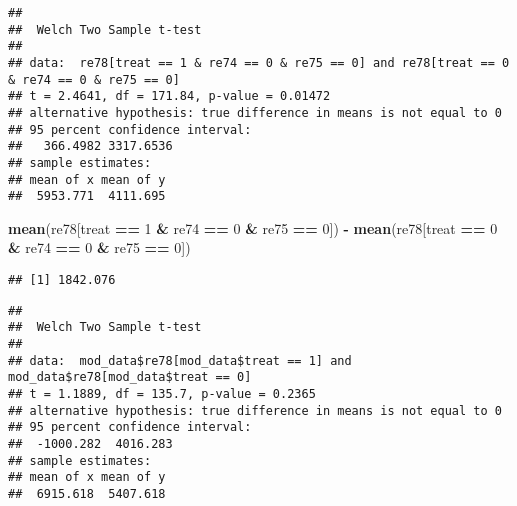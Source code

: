 \documentclass[
]{article}
\newenvironment{Shaded}{\begin{snugshade}}{\end{snugshade}}
\newcommand{\DecValTok}[1]{\textcolor[rgb]{0.00,0.00,0.81}{#1}}
\newcommand{\KeywordTok}[1]{\textcolor[rgb]{0.13,0.29,0.53}{\textbf{#1}}}
\newcommand{\NormalTok}[1]{#1}
\newcommand{\OperatorTok}[1]{\textcolor[rgb]{0.81,0.36,0.00}{\textbf{#1}}}
\newcommand{\StringTok}[1]{\textcolor[rgb]{0.31,0.60,0.02}{#1}}
\begin{document}
\begin{verbatim}
## 
##  Welch Two Sample t-test
## 
## data:  re78[treat == 1 & re74 == 0 & re75 == 0] and re78[treat == 0 & re74 == 0 & re75 == 0]
## t = 2.4641, df = 171.84, p-value = 0.01472
## alternative hypothesis: true difference in means is not equal to 0
## 95 percent confidence interval:
##   366.4982 3317.6536
## sample estimates:
## mean of x mean of y 
##  5953.771  4111.695
\end{verbatim}

\begin{Shaded}
\begin{Highlighting}[]
\KeywordTok{mean}\NormalTok{(re78[treat }\OperatorTok{==}\StringTok{ }\DecValTok{1} \OperatorTok{&}\StringTok{ }\NormalTok{re74 }\OperatorTok{==}\StringTok{ }\DecValTok{0} \OperatorTok{&}\StringTok{ }\NormalTok{re75 }\OperatorTok{==}\StringTok{ }\DecValTok{0}\NormalTok{]) }\OperatorTok{-}\StringTok{ }\KeywordTok{mean}\NormalTok{(re78[treat }\OperatorTok{==}\StringTok{ }\DecValTok{0} \OperatorTok{&}\StringTok{ }\NormalTok{re74 }\OperatorTok{==}\StringTok{ }\DecValTok{0} \OperatorTok{&}\StringTok{ }\NormalTok{re75 }\OperatorTok{==}\StringTok{ }\DecValTok{0}\NormalTok{])}
\end{Highlighting}
\end{Shaded}

\begin{verbatim}
## [1] 1842.076
\end{verbatim}

\begin{Shaded}
\end{Shaded}

\begin{verbatim}
## 
##  Welch Two Sample t-test
## 
## data:  mod_data$re78[mod_data$treat == 1] and mod_data$re78[mod_data$treat == 0]
## t = 1.1889, df = 135.7, p-value = 0.2365
## alternative hypothesis: true difference in means is not equal to 0
## 95 percent confidence interval:
##  -1000.282  4016.283
## sample estimates:
## mean of x mean of y 
##  6915.618  5407.618
\end{verbatim}
\end{document}
